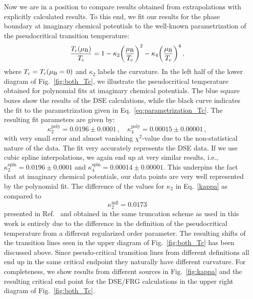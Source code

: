 \documentclass[%
    aps,
    prd,
    reprint,
    superscriptaddress,
    floatfix,
    nofootinbib,
    noamsmath,
    noamssymb
]{revtex4-2}
\newcommand*{\+}{\hspace*{.08335em}}
\newcommand*{\?}{\hspace*{-.08335em}}
\newcommand*{\Tc}{T_{\textup{c}}}
\newcommand*{\muB}{\mu_{\textup{B}}}
\begin{document}
Now we are in a position to compare results obtained from extrapolations with
explicitly calculated results. To this end, we fit our results for the phase
boundary at imaginary chemical potentials to the well-known parametrization of
the pseudocritical transition temperature:
\begin{equation}
    \label{eq:parametrization_Tc}
    \frac{\Tc(\muB)}{\Tc}
    =
    1
    -
    \kappa_{2} \biggl( \frac{\muB}{\Tc} \biggr)^2
    -
    \kappa_{4} \biggl( \frac{\muB}{\Tc} \biggr)^4
    \,,
\end{equation}
where $\Tc = \Tc(\muB = 0)$ and $\kappa_{2}$ labels the curvature. In the left
half of the lower diagram of Fig.~\ref{fig:both_Tc}, we illustrate the
pseudocritical temperature obtained for polynomial fits at imaginary chemical
potentials. The blue square boxes show the results of the DSE calculations,
while the black curve indicates the fit to the parametrization given in
Eq.~\eqref{eq:parametrization_Tc}. The resulting fit parameters are given by:
\begin{equation}\label{kappa}
    \kappa_{2}^{\text{poly}} = 0.0196 \pm 0.0001
    \,,
    \quad
    \kappa_{4}^{\text{poly}} = 0.00015 \pm 0.00001
    \,,
\end{equation}
with very small error and almost vanishing $\chi^2$-value due to the non-statistical 
nature of the data. The fit very accurately
represents the DSE data. If we use cubic spline interpolations, we again end up
at very similar results, i.e., $\kappa_{2}^{\text{spln}} = 0.0196 \pm 0.0001$ and
$\kappa_{4}^{\text{spln}} = 0.00014 \pm 0.00001$. This underpins the fact that at imaginary
chemical potentials, our data points are very well represented by the polynomial
fit. The difference of the values for $\kappa_{2}$ in Eq.~\eqref{kappa} as
compared to
\begin{equation}
    \kappa_{2}^{\text{infl}}
    =
    0.0173
\end{equation}
presented in Ref.~\cite{Gunkel:2021oya} and obtained in the same truncation scheme 
as used in this work is entirely due to the difference in the definition of the 
pseudocritical temperature from a different regularized order parameter. The 
resulting shifts of the transition lines seen in the upper diagram of Fig.~\ref{fig:both_Tc} 
has been discussed above. Since pseudo-critical transition lines from different 
definitions all end up in the same critical endpoint they naturally have different 
curvature. For completeness, we show results from different sources in Fig.~\ref{fig:kappa}
and the resulting critical end point for the DSE/FRG calculations in the upper right 
diagram of Fig.~\ref{fig:both_Tc}. 
\end{document}
